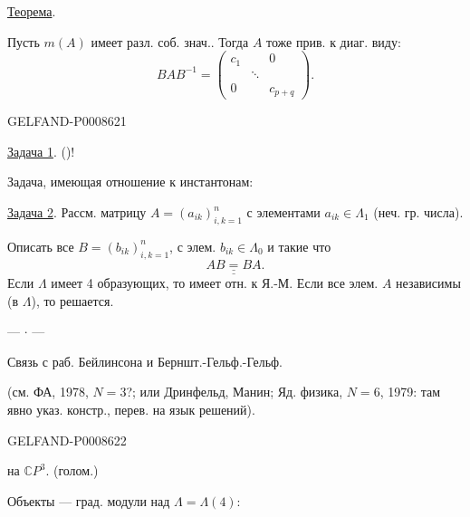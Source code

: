 \uline{Теорема}.

Пусть \(m(A)\) имеет разл. соб. знач.. Тогда \(A\) тоже прив. к диаг. виду:
\[
BAB^{-1}=\begin{pmatrix}c_1&&0\\&\ddots&\\0&&c_{p+q}\end{pmatrix}.\tag{10}
\]


\begin{GelfandAdjacentEvidence}{GELFAND-P000862}{1}

\uline{Задача 1}.  ()!

Задача, имеющая отношение к инстантонам:

\uline{Задача 2}. Рассм. матрицу \(A=(a_{ik})_{i,k=1}^{n}\) с элементами
\(a_{ik}\in\Lambda_1\) (неч. гр. числа).

Описать все \(B=(b_{ik})_{i,k=1}^{n}\), с элем. \(b_{ik}\in\Lambda_0\) и такие что
\[
\underline{\underline{AB=BA}}.
\]
Если \(\Lambda\) имеет 4 образующих, то имеет отн. к Я.-М.
Если все элем. \(A\) независимы (в \(\Lambda\)), то решается.
\begin{center}— \(\cdot\) —\end{center}

 Связь с раб. Бейлинсона и Берншт.-Гельф.-Гельф.

(см. ФА, 1978, \(N=3\)?; или Дринфельд, Манин; Яд. физика, \(N=6\), 1979:
там явно указ. констр., перев. на язык решений).
\end{GelfandAdjacentEvidence}
\begin{GelfandAdjacentEvidence}{GELFAND-P000862}{2}


 на \(\mathbb C P^3\). (голом.)

Объекты — град. модули над \(\Lambda=\Lambda(4)\):
\end{GelfandAdjacentEvidence}
